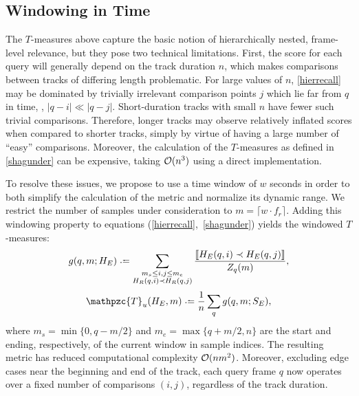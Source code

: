 \documentclass{article}
\def\shag{\ensuremath{\mathpzc{T}}}
\begin{document}

\subsection{Windowing in Time}

The $T$-measures above capture the basic notion of hierarchically nested, frame-level relevance, but they pose two technical limitations.
First, the score for each query will generally depend on the track duration $n$, which makes comparisons between tracks of differing length problematic.  
For large values of $n$, \cref{hierrecall} may be dominated by trivially irrelevant comparison points $j$ which lie far from $q$ in time, \ie, $|q-i| \ll |q-j|$.
Short-duration tracks with small $n$ have fewer such trivial comparisons.
Therefore, longer tracks may observe relatively inflated scores when compared to shorter tracks, simply by virtue of having a large number of ``easy'' comparisons.
Moreover, the calculation of the $T$-measures as defined in \cref{shagunder} can be expensive, taking $\mathcal{O}(n^3)$ using a direct implementation.

To resolve these issues, we propose to use a time window of $w$ seconds in order to both simplify the 
calculation of the metric and normalize its dynamic range.
We restrict the number of samples under consideration to $m = \lceil w \cdot f_r \rceil$.
Adding this windowing property to equations (\ref{hierrecall},~\ref{shagunder}) yields the windowed $T$-measures:
\begin{equation}
  g(q, m ; H_E) \defeq \sum_{\substack{
  m_s \leq i,j \leq m_e \\ 
  H_R(q, i) \prec H_R(q, j) }} \frac{\ind{H_E(q, i) \prec H_E(q,
  j)}}{Z_q(m)},\label{windowrecall}
\end{equation}
\begin{equation}
\shag_u(H_E, m) \defeq \frac{1}{n} \sum_q g(q,m ; S_E),
\end{equation}
where $m_s = \min\{0,q-m/2\}$ and $m_e = \max\{q+m/2,n\}$ are the start and ending, respectively, of the current window in sample indices.
The resulting metric has reduced computational complexity $\mathcal{O}(nm^2)$.  Moreover, excluding edge cases near the beginning and end of the track, each query frame $q$ now operates over a
fixed number of comparisons $(i, j)$, regardless of the track duration.
\end{document}
